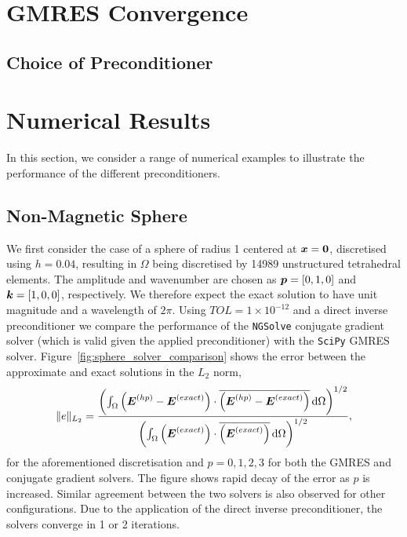\documentclass[a4paper,12]{elsarticle}
\theoremstyle{definition}
\renewcommand{\vec}[1]{\mbox{\boldmath$#1$}}
\begin{document}
\section{GMRES Convergence}



\subsection{Choice of Preconditioner}


\section{Numerical Results}
In this section, we consider a range of numerical examples to illustrate the performance of the different preconditioners.

\subsection{Non-Magnetic Sphere}

We first consider the case of a sphere of radius 1 centered at $\vec{x}=\vec{0}$, discretised using $h=0.04$, resulting in $\Omega$ being discretised by 14989 unstructured tetrahedral elements. The amplitude and wavenumber are chosen as $\vec{p} = [0,1,0]$ and $\vec{k}=[1,0,0]$, respectively. We therefore expect the exact solution to have unit magnitude and a wavelength of $2\pi$. 
Using $TOL=1\times 10^{-12}$ and a direct inverse preconditioner we compare the performance of the \texttt{NGSolve} conjugate gradient solver (which is valid given the applied preconditioner) with the \texttt{SciPy} GMRES solver. Figure~\ref{fig:sphere_solver_comparison} shows the error between the approximate and exact solutions in the $L_2$ norm,
\begin{equation}
\|e\|_{L_2} = \frac{\left(\int_\Omega \left(\vec{E}^{(hp)} - \vec{E}^{(exact)}\right) \cdot \overline{\left(\vec{E}^{(hp)} - \vec{E}^{(exact)}\right)} \, \mathrm{d}\Omega\right)^{1/2}}{\left(\int_\Omega \left(\vec{E}^{(exact)}\right) \cdot \overline{\left(\vec{E}^{(exact)}\right)} \, \mathrm{d}\Omega\right)^{1/2}},
\end{equation}
for the aforementioned discretisation and $p=0,1,2,3$ for both the GMRES and conjugate gradient solvers. The figure shows rapid decay of the error as $p$ is increased. Similar agreement between the two solvers is also observed for other configurations. Due to the application of the direct inverse preconditioner, the solvers converge in 1 or 2 iterations.
\end{document}
